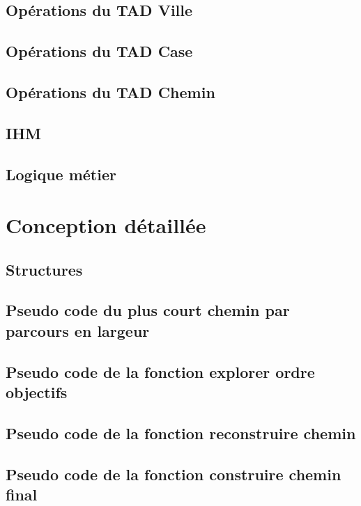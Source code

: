 \subsection{Opérations du TAD Ville}

\subsection{Opérations du TAD Case}

\subsection{Opérations du TAD Chemin}

\subsection{IHM}

\subsection{Logique métier}


\section{Conception détaillée}
\subsection{Structures}

\subsection{Pseudo code du plus court chemin par parcours en largeur}

\subsection{Pseudo code de la fonction explorer ordre objectifs }

\subsection{Pseudo code de la fonction reconstruire chemin}

\subsection{Pseudo code de la fonction  construire chemin final}

